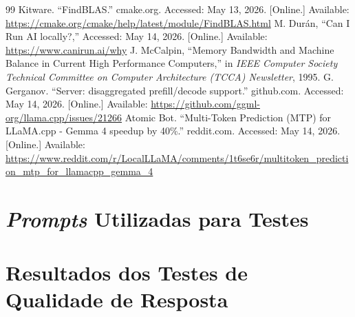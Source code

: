 \documentclass[11pt, a4paper]{article}
\renewcommand{\arraystretch}{1.5}
\begin{document}
\begin{thebibliography}{99}
        Kitware.
        ``FindBLAS.''
        cmake.org.
        Accessed: May 13, 2026. [Online.] Available:
        \url{https://cmake.org/cmake/help/latest/module/FindBLAS.html}
        M. Durán,
        ``Can I Run AI locally?,''
        Accessed: May 14, 2026. [Online.] Available:
        \url{https://www.canirun.ai/why}
        J. McCalpin,
        ``Memory Bandwidth and Machine Balance in Current High Performance Computers,'' in
        \emph{IEEE Computer Society Technical Committee on Computer Architecture (TCCA) Newsletter},
        1995.
        G. Gerganov.
        ``Server: disaggregated prefill/decode support.''
        github.com.
        Accessed: May 14, 2026. [Online.] Available:
        \url{https://github.com/ggml-org/llama.cpp/issues/21266}
        Atomic Bot.
        ``Multi-Token Prediction (MTP) for LLaMA.cpp - Gemma 4 speedup by 40\%.''
        reddit.com.
        Accessed: May 14, 2026. [Online.] Available:
        \url{
            https://www.reddit.com/r/LocalLLaMA/comments/1t6se6r/multitoken_prediction_mtp_for_llamacpp_gemma_4
        }
\end{thebibliography}

\pagebreak
\begin{appendix}

\section{\emph{Prompts} Utilizadas para Testes}
\label{prompts}


\section{Resultados dos Testes de Qualidade de Resposta}
\label{all-prompt-evaluations}
\bgroup
    \renewcommand{\arraystretch}{1.25}
    
\egroup

\end{appendix}
\end{document}
